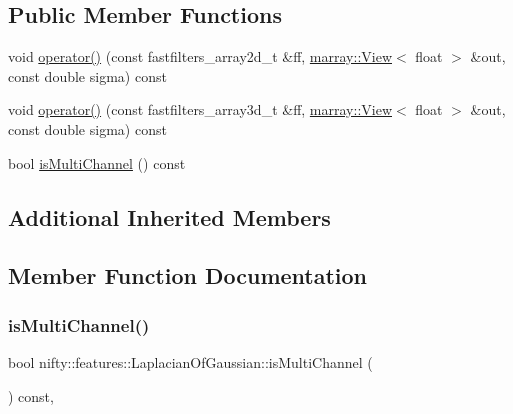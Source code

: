 \subsection*{Public Member Functions}
\begin{DoxyCompactItemize}
\item 
void \hyperlink{structnifty_1_1features_1_1LaplacianOfGaussian_a35537b627fd708494af6857ad5312e4b}{operator()} (const fastfilters\+\_\+array2d\+\_\+t \&ff, \hyperlink{classandres_1_1View}{marray\+::\+View}$<$ float $>$ \&out, const double sigma) const
\item 
void \hyperlink{structnifty_1_1features_1_1LaplacianOfGaussian_a1b7536cdff2a3f16035d55c58e3922ce}{operator()} (const fastfilters\+\_\+array3d\+\_\+t \&ff, \hyperlink{classandres_1_1View}{marray\+::\+View}$<$ float $>$ \&out, const double sigma) const
\item 
bool \hyperlink{structnifty_1_1features_1_1LaplacianOfGaussian_aaf34aa1ea6844c2166ed474db7e1b694}{is\+Multi\+Channel} () const
\end{DoxyCompactItemize}
\subsection*{Additional Inherited Members}


\subsection{Member Function Documentation}
\mbox{\label{structnifty_1_1features_1_1LaplacianOfGaussian_aaf34aa1ea6844c2166ed474db7e1b694}} 
\subsubsection{\texorpdfstring{is\+Multi\+Channel()}{isMultiChannel()}}
{\footnotesize\ttfamily bool nifty\+::features\+::\+Laplacian\+Of\+Gaussian\+::is\+Multi\+Channel (\begin{DoxyParamCaption}{ }\end{DoxyParamCaption}) const\hspace{0.3cm}{\ttfamily [inline]}, {\ttfamily [virtual]}}



